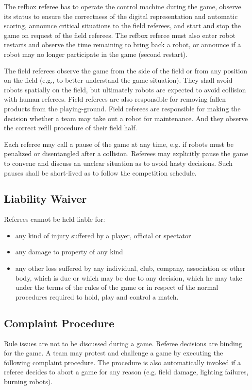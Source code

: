 \documentclass[12pt,twoside]{article}
\begin{document}
The refbox referee has to operate the control machine during the game,
observe its status to ensure the correctness of the digital
representation and automatic scoring, announce critical situations to
the field referees, and start and stop the game on request of the
field referees. The refbox referee must also enter robot restarts and
observe the time remaining to bring back a robot, or announce if a
robot may no longer participate in the game (second restart).

The field referees observe the game from the side of the field or from
any position on the field (e.g., to better understand the game
situation). They shall avoid robots spatially on the field, but
ultimately robots are expected to avoid collision with human
referees. Field referees are also responsible for removing fallen
products from the playing-ground. Field referees are responsible for
making the decision whether a team may take out a robot for
maintenance. And they observe the correct refill procedure of their
field half.

Each referee may call a pause of the game at any time, e.g. if robots
must be penalized or disentangled after a collision. Referees may
explicitly pause the game to convene and discuss an unclear situation
as to avoid hasty decisions. Such pauses shall be short-lived as to
follow the competition schedule.

\subsection{Liability Waiver}
Referees cannot be held liable for:
\begin{itemize}
\item any kind of injury suffered by a player, official or spectator
\item any damage to property of any kind
\item any other loss suffered by any individual, club, company,
  association or other body, which is due or which may be due to any
  decision, which he may take under the terms of the rules of the game
  or in respect of the normal procedures required to hold, play and
  control a match.
\end{itemize}

\subsection{Complaint Procedure}
Rule issues are not to be discussed during a game. Referee decisions
are binding for the game. A team may protest and challenge a game by
executing the following complaint procedure. The procedure is also
automatically invoked if a referee decides to abort a game for any
reason (e.g. field damage, lighting failures, burning robots).
\end{document}
